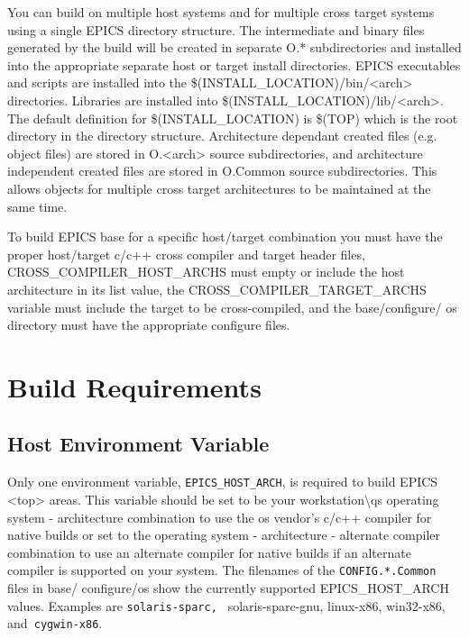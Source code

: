You can build on multiple host systems and for multiple cross target systems using a single EPICS directory structure. 
The intermediate and binary files generated by the build will be created in separate O.* subdirectories and installed into 
the appropriate separate host or target install directories. EPICS executables and scripts are installed into the 
\$(INSTALL\_LOCATION)/bin/\textless{}arch\textgreater{} directories. Libraries are installed into \$(INSTALL\_LOCATION)/lib/\textless{}arch\textgreater{}. The 
default definition for \$(INSTALL\_LOCATION) is \$(TOP) which is the root directory in the directory structure. 
Architecture dependant created files (e.g. object files) are stored in O.\textless{}arch\textgreater{} source subdirectories, and architecture 
independent created files are stored in O.Common source subdirectories. This allows objects for multiple cross target 
architectures to be maintained at the same time. 

To build EPICS base for a specific host/target combination you must have the proper host/target c/c++ cross compiler and 
target header files, CROSS\_COMPILER\_HOST\_ARCHS must empty or include the host architecture in its list value, the 
CROSS\_COMPILER\_TARGET\_ARCHS variable must include the target to be cross-compiled, and the base/configure/
os directory must have the appropriate configure files.

\section{Build Requirements}

\subsection{Host Environment Variable}

Only one environment variable, \verb|EPICS_HOST_ARCH|, is required to build EPICS \textless{}top\textgreater{} areas. This variable should be 
set to be your workstation\textbackslash{}qs operating system - architecture combination to use the os vendor's c/c++ compiler for native 
builds or set to the operating system - architecture - alternate compiler combination to use an alternate compiler for native 
builds if an alternate compiler is supported on your system. The filenames of the \verb|CONFIG.*.Common |files in base/
configure/os show the currently supported EPICS\_HOST\_ARCH values. Examples are \verb|solaris-sparc, |
solaris-sparc-gnu, linux-x86, win32-x86, and\verb| cygwin-x86|. 

